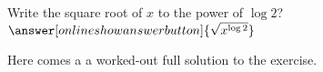 \documentclass{ximera}
\begin{document}
\begin{exercise}
\begin{question}
        Write the square root of $x$ to the power of $\log 2$?  $\answer[onlineshowanswerbutton]{\sqrt{x^{\log 2}}}$
		\begin{oplossing}[show]
			Here comes a a worked-out full solution to the exercise.
		\end{oplossing}
	\end{question}
\end{exercise}
\end{document}
